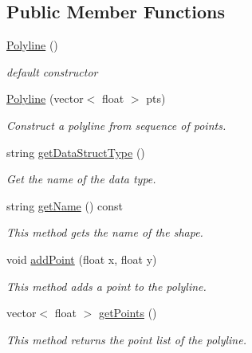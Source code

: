 \subsection*{Public Member Functions}
\begin{DoxyCompactItemize}
\item 
\hyperlink{classbridges_1_1datastructure_1_1_polyline_a488f6612485fc66534035c3574281a11}{Polyline} ()
\begin{DoxyCompactList}\small\item\em default constructor \end{DoxyCompactList}\item 
\hyperlink{classbridges_1_1datastructure_1_1_polyline_aceb69c3294ab4c16b2931e1073d3f996}{Polyline} (vector$<$ float $>$ pts)
\begin{DoxyCompactList}\small\item\em Construct a polyline from sequence of points. \end{DoxyCompactList}\item 
string \hyperlink{classbridges_1_1datastructure_1_1_polyline_a49b37ad55cf64fe759ee5a0f46e2e0cc}{get\+Data\+Struct\+Type} ()
\begin{DoxyCompactList}\small\item\em Get the name of the data type. \end{DoxyCompactList}\item 
string \hyperlink{classbridges_1_1datastructure_1_1_polyline_a46f2830cd85a09e9c4d62d54110dbe13}{get\+Name} () const
\begin{DoxyCompactList}\small\item\em This method gets the name of the shape. \end{DoxyCompactList}\item 
void \hyperlink{classbridges_1_1datastructure_1_1_polyline_a00698223911f07cafca29ec80c507678}{add\+Point} (float x, float y)
\begin{DoxyCompactList}\small\item\em This method adds a point to the polyline. \end{DoxyCompactList}\item 
vector$<$ float $>$ \hyperlink{classbridges_1_1datastructure_1_1_polyline_a634034b6874af45e2b8c56d70e8725c5}{get\+Points} ()
\begin{DoxyCompactList}\small\item\em This method returns the point list of the polyline. \end{DoxyCompactList}\item 

\end{DoxyCompactItemize}
